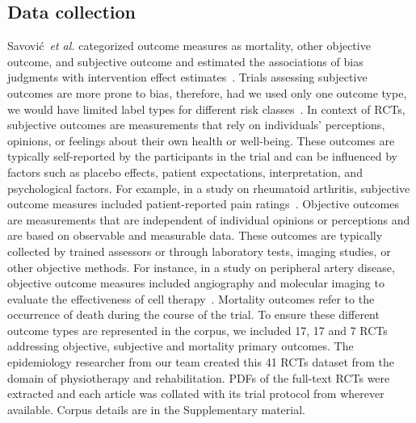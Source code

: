 \documentclass[sn-mathphys,Numbered]{sn-jnl}%
\theoremstyle{thmstyleone}%
\theoremstyle{thmstyletwo}%
\theoremstyle{thmstylethree}%
\begin{document}
\subsection{Data collection}
\label{data}
%
Savović~\textit{et al.} categorized outcome measures as mortality, other objective outcome, and subjective outcome and estimated the associations of bias judgments with intervention effect estimates~\cite{savovic2018association}.
Trials assessing subjective outcomes are more prone to bias, therefore, had we used only one outcome type, we would have limited label types for different risk classes~\cite{page2016empirical}.
In context of RCTs, subjective outcomes are measurements that rely on individuals' perceptions, opinions, or feelings about their own health or well-being.
These outcomes are typically self-reported by the participants in the trial and can be influenced by factors such as  placebo effects, patient expectations, interpretation, and psychological factors.
For example, in a study on rheumatoid arthritis, subjective outcome measures included patient-reported pain ratings~\cite{vollert2020assessment}.
Objective outcomes are measurements that are independent of individual opinions or perceptions and are based on observable and measurable data.
These outcomes are typically collected by trained assessors or through laboratory tests, imaging studies, or other objective methods.
For instance, in a study on peripheral artery disease, objective outcome measures included angiography and molecular imaging to evaluate the effectiveness of cell therapy~\cite{grimaldi2016imaging}.
Mortality outcomes refer to the occurrence of death during the course of the trial.
To ensure these different outcome types are represented in the corpus, we included 17, 17 and 7 RCTs addressing objective, subjective and mortality primary outcomes.
The epidemiology researcher from our team created this 41 RCTs dataset from the domain of physiotherapy and rehabilitation.
PDFs of the full-text RCTs were extracted and each article was collated with its trial protocol from wherever available.
Corpus details are in the Supplementary material.
%
%
%
\end{document}
